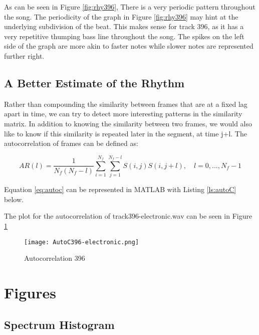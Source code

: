 \documentclass{article} %
\begin{document}
As can be seen in Figure \ref{fig:rhy396}, There is a very periodic pattern throughout the song. The periodicity of the graph in Figure \ref{fig:rhy396} may hint
at the underlying subdivision of the beat. This makes sense for track 396, as it has a very repetitive thumping bass line throughout the song. The spikes on the left
side of the graph are more akin to faster notes while slower notes are represented further right. 


\subsection{A Better Estimate of the Rhythm}
Rather than compounding the similarity between frames that are at a fixed lag apart in time, we can try to detect more interesting patterns in the similarity matrix. 
In addition to knowing the similarity between two frames, we would also like to know if this similarity is repeated later in the segment, at time j+l. 
The autocorrelation of frames can be defined as:

\begin{equation}
\label{eq:autoc}
AR(l)= \frac{1}{N_f(N_f-l)} \sum\limits_{i=1}^{N_f}  \sum\limits_{j=1}^{N_f-l} S(i,j)S(i,j+l), \quad l=0,\dots,N_f-1
\end{equation}

Equation \ref{eq:autoc} can be represented in MATLAB with Listing  \ref{ls:autoC} below. 

 

The plot for the autocorrelation of track396-electronic.wav can be seen in Figure \ref{fig:auto396}

\begin{figure}[H]
\centering
\texttt{[image: AutoC396-electronic.png]}
\caption{Autocorrelation 396}
\label{fig:auto396}
\end{figure}



\clearpage
\appendix
\section{Figures}
\subsection{Spectrum Histogram}
\label{sec:specHis}
\end{document}
